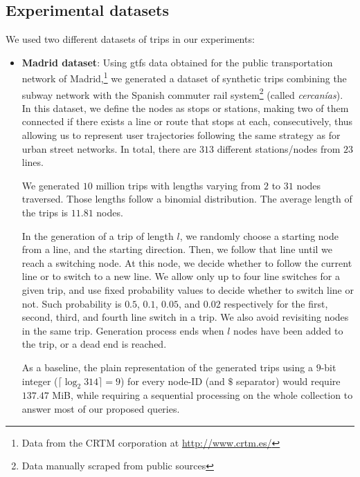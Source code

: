 	\subsection{Experimental datasets}
	\label{sec:ctr:exp:data}
	We used two different datasets of trips in our experiments:
	\begin{itemize}
	
	  \item {\bf Madrid dataset}:
	  Using \gls{gtfs} data obtained for the public transportation network of 
	  {Madrid},\footnote{Data from
	  the CRTM corporation at \url{http://www.crtm.es/}} we generated a dataset of 
	  synthetic trips combining the subway network with the Spanish commuter rail system\footnote{Data manually scraped from public sources} (called {\em cercan\'ias}). 
	  In this dataset, we define the nodes as stops or stations, making two of them connected if there exists a line or route that stops at each, consecutively, thus allowing us to represent user trajectories following the same strategy as for urban street networks.
	  In total, there are $313$ different stations/nodes from $23$ lines.
	 
	We generated $10$ million trips with lengths varying from $2$ to $31$ nodes traversed. Those lengths follow a binomial 
	distribution. The average length of the trips is $11.81$ nodes. 
	
	In the generation of a trip of length $l$, we randomly choose a starting node from a line, and the starting direction. 
	Then, we follow that line until we reach a switching node. At this node, we decide whether to follow the current 
	line or to switch to a new line. We allow only up to four line switches for a given trip, and use fixed probability 
	values to decide whether to switch line or not. Such probability is $0.5$, $0.1$, $0.05$, and $0.02$ respectively 
	for the first, second, third, and fourth line switch in a trip. 
	We also avoid revisiting nodes in the same trip. 
	Generation process ends when $l$ nodes have been added to the trip, or a dead end is reached.

	As a baseline, the plain representation of the generated trips using a $9$-bit integer ($\lceil\log_2 314\rceil= 9$) 
	for every node-ID (and $\$$ separator) would require $137.47$ MiB, while requiring a sequential processing on the whole collection to answer most of our proposed queries.
	 

\end{itemize}
